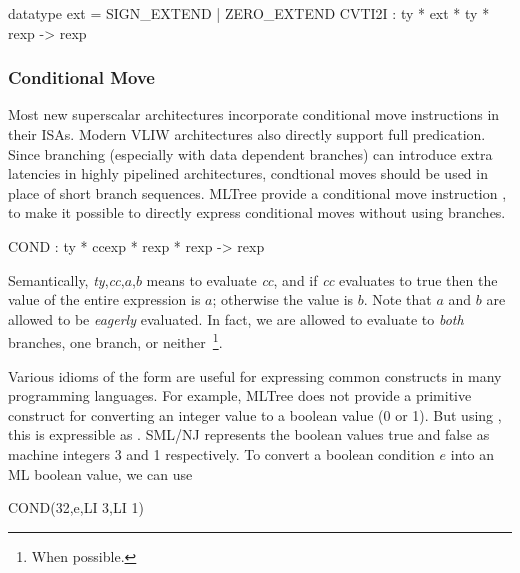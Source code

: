 \begin{SML}
    datatype ext = SIGN_EXTEND | ZERO_EXTEND
    CVTI2I : ty * ext * ty * rexp -> rexp 
\end{SML}

\subsubsection{Conditional Move} \label{sec:cond-move}
Most new superscalar architectures incorporate conditional move 
instructions in their ISAs.  
Modern VLIW architectures also directly support full predication.  
Since branching (especially with data dependent branches) can
introduce extra latencies in highly pipelined architectures,
condtional moves should be used in place of short branch sequences. 
MLTree provide a conditional move instruction ,
to make it possible to directly express conditional moves without using
branches. 
\begin{SML}
   COND : ty * ccexp * rexp * rexp -> rexp
\end{SML}

Semantically, \emph{ty},\emph{cc},$a$,$b$\sml{)} means to evaluate
\emph{cc}, and if \emph{cc} evaluates to true then the value of the entire expression is
$a$; otherwise the value is $b$.  Note that $a$ and $b$ are allowed to be
\emph{eagerly}
evaluated.  In fact, we are allowed to evaluate to \emph{both}
branches, one branch, or neither~\footnote{When possible.}. 

Various idioms of the  form are useful for expressing common
constructs in many programming languages.  For example, MLTree does not
provide a primitive construct for converting an integer value  to a
boolean value (0 or 1).  But using , this is expressible as
.  SML/NJ represents
the boolean values true and false as machine integers 3 and 1 respectively.
To convert a boolean condition $e$ into an ML boolean value, we can use
\begin{SML}
   COND(32,e,LI 3,LI 1)
\end{SML}

